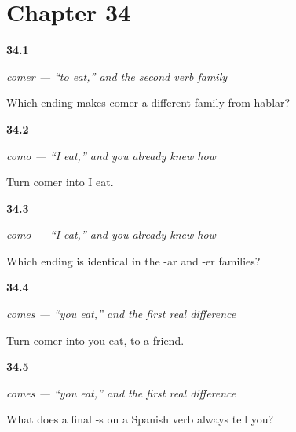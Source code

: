\section*{Chapter 34}

\noindent\begin{minipage}[t]{\linewidth}
\raggedright
\hypertarget{review-ES-C07-comer-family}{\textbf{34.1}} \emph{comer — \textquotedblleft{}to eat,\textquotedblright{} and the second verb family}\par
\small Which ending makes comer a different family from hablar?
\end{minipage}\par\medskip

\noindent\begin{minipage}[t]{\linewidth}
\raggedright
\hypertarget{review-ES-C07-como-form}{\textbf{34.2}} \emph{como — \textquotedblleft{}I eat,\textquotedblright{} and you already knew how}\par
\small Turn comer into I eat.
\end{minipage}\par\medskip

\noindent\begin{minipage}[t]{\linewidth}
\raggedright
\hypertarget{review-ES-C07-como-same}{\textbf{34.3}} \emph{como — \textquotedblleft{}I eat,\textquotedblright{} and you already knew how}\par
\small Which ending is identical in the -ar and -er families?
\end{minipage}\par\medskip

\noindent\begin{minipage}[t]{\linewidth}
\raggedright
\hypertarget{review-ES-C07-comes-form}{\textbf{34.4}} \emph{comes — \textquotedblleft{}you eat,\textquotedblright{} and the first real difference}\par
\small Turn comer into you eat, to a friend.
\end{minipage}\par\medskip

\noindent\begin{minipage}[t]{\linewidth}
\raggedright
\hypertarget{review-ES-C07-comes-s}{\textbf{34.5}} \emph{comes — \textquotedblleft{}you eat,\textquotedblright{} and the first real difference}\par
\small What does a final -s on a Spanish verb always tell you?
\end{minipage}\par\medskip

